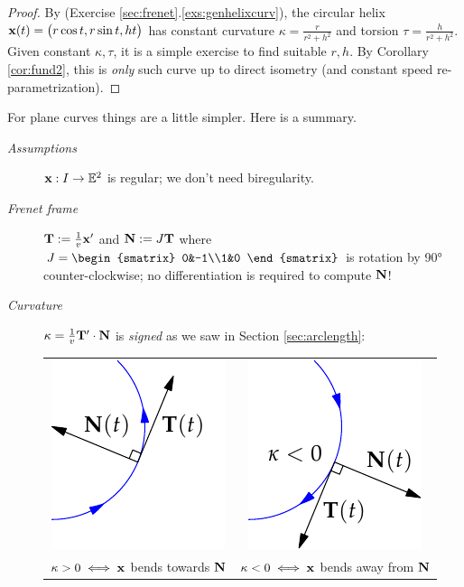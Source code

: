 \begin{proof}
By (Exercise \ref*{sec:frenet}.\ref{exs:genhelixcurv}), the circular helix ${\mathbf{x}}(t)=\bigl(r\cos t,r\sin t,ht\bigr)$ has constant curvature $\kappa=\frac r{r^2+h^2}$ and torsion $\tau=\frac h{r^2+h^2}$.\smallbreak
Given constant $\kappa,\tau$, it is a simple exercise to find suitable $r,h$. By Corollary \ref{cor:fund2}, this is \emph{only} such curve up to direct isometry (and constant speed re-parametrization).
\end{proof}


For plane curves things are a little simpler. Here is a summary. 
\begin{description}
	\item[\normalfont\emph{Assumptions}] ${\mathbf{x}}:I\to\mathbb{E}^2$ is regular; we don't need biregularity.
	
	\item[\normalfont\emph{Frenet frame}] ${\mathbf{T}}:=\frac 1{v}{\mathbf{x}}'$ and ${\mathbf{N}}:=J{\mathbf{T}}$ where $J=\begin{smatrix}
		0&-1\\1&0	
	\end{smatrix}$ is rotation by \ang{90} counter-clockwise; no differentiation is required to compute ${\mathbf{N}}$!
	
	\item[\normalfont\emph{Curvature}] $\kappa=\frac 1v{\mathbf{T}}'\cdot{\mathbf{N}}$ is \emph{signed} as we saw in Section \ref{sec:arclength}:
	\begin{center}
	\begin{tabular}{c@{\qquad\qquad}c}
	\includegraphics{fund-e2}&\includegraphics{fund-e2a}\\
	$\kappa>0\iff {\mathbf{x}}$ bends towards ${\mathbf{N}}$
	&
	$\kappa<0\iff {\mathbf{x}}$ bends away from ${\mathbf{N}}$
	\end{tabular}
	\end{center}
	

\end{description}
